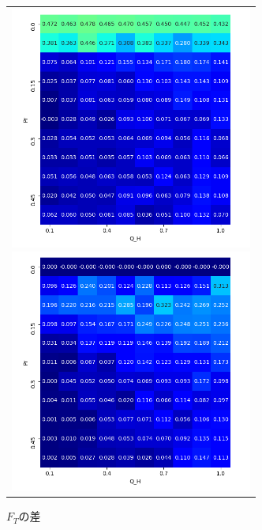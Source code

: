 \documentclass[a4paper,fontsize=11pt,report,notitlepage,line_length=38zw,number_of_lines=40,dvipdfmx]{jlreq}
\begin{document}
\begin{figure}[hbtp]
  \begin{center}
    \begin{tabular}{c}
      \begin{minipage}{0.5\hsize}
        \begin{center}
          \includegraphics[width=8cm]{Dif_seller.png}
          \caption{$F_H$の差}
          \label{Dif_seller}
        \end{center}
      \end{minipage}

      \begin{minipage}{0.5\hsize}
        \begin{center}
          \includegraphics[width=8cm]{Dif_buyer.png}
          \caption{$F_T$の差}
           \label{Dif_buyer}
        \end{center}
      \end{minipage}
    \end{tabular}
  \end{center}
\end{figure}
\end{document}
